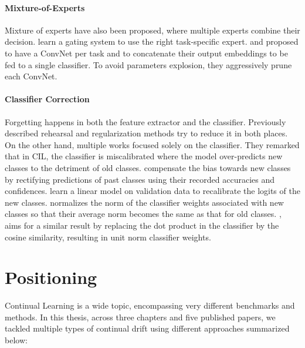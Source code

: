 \paragraph{Mixture-of-Experts} Mixture of experts \citep{masoudnia2014mixture} have also been
proposed, where multiple experts combine their decision. \cite{aljundi2017experts} learn a gating
system to use the right task-specific expert. \cite{yan2021der} and \cite{li2021preserve} proposed
to have a \ac{ConvNet} per task and to concatenate their output embeddings to be fed to a single
classifier. To avoid parameters explosion, they aggressively prune each \ac{ConvNet}.

\paragraph{Classifier Correction} Forgetting happens in both the feature extractor and the
classifier. Previously described rehearsal and regularization methods try to reduce it in both
places. On the other hand, multiple works focused solely on the classifier. They remarked that in
\acf{CIL}, the classifier is miscalibrated \citep{guo2017miscalibration} where the model
over-predicts new classes to the detriment of old classes. \cite{belouadah2019il2m} compensate the
bias towards new classes by rectifying predictions of past classes using their recorded accuracies
and confidences. \cite{wu2019bias_correction} learn a linear model on validation data to recalibrate
the logits of the new classes. \cite{zhao2020weightalignement} normalizes the norm of the classifier
weights associated with new classes so that their average norm becomes the same as that for old
classes. \cite{hou2019ucir}, aims for a similar result by replacing the dot product in the
classifier by the cosine similarity, resulting in unit norm classifier weights.

\section{Positioning}

Continual Learning is a wide topic, encompassing very different benchmarks and methods. In this
thesis, across three chapters and five published papers, we tackled multiple types of continual drift using
different approaches summarized below:


